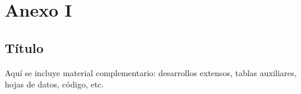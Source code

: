 \chapter{Anexo I}
\label{anexo1}

\section*{Título}

Aquí se incluye material complementario: desarrollos extensos, tablas auxiliares, hojas de datos, código, etc.

